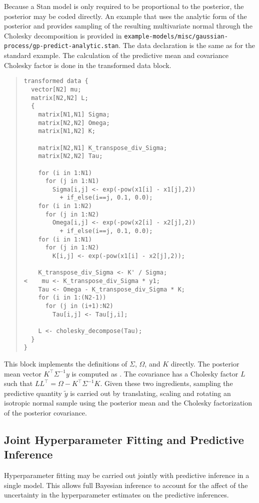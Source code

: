 Because a Stan model is only required to be proportional to the
posterior, the posterior may be coded directly.  An example that uses
the analytic form of the posterior and provides sampling of the
resulting multivariate normal through the Cholesky decomposition is
provided in
\nolinkurl{example-models/misc/gaussian-process/gp-predict-analytic.stan}.  
The data declaration is the same as for the standard example.  The
calculation of the predictive mean  and covariance Cholesky
factor  is done in the transformed data block.
%
\begin{quote}
\begin{Verbatim}[fontsize=\small]
transformed data {
  vector[N2] mu;
  matrix[N2,N2] L;
  { 
    matrix[N1,N1] Sigma;
    matrix[N2,N2] Omega;
    matrix[N1,N2] K;
    
    matrix[N2,N1] K_transpose_div_Sigma;
    matrix[N2,N2] Tau;

    for (i in 1:N1) 
      for (j in 1:N1)
        Sigma[i,j] <- exp(-pow(x1[i] - x1[j],2)) 
          + if_else(i==j, 0.1, 0.0);
    for (i in 1:N2) 
      for (j in 1:N2)
        Omega[i,j] <- exp(-pow(x2[i] - x2[j],2)) 
          + if_else(i==j, 0.1, 0.0); 
    for (i in 1:N1)
      for (j in 1:N2)
        K[i,j] <- exp(-pow(x1[i] - x2[j],2));
    
    K_transpose_div_Sigma <- K' / Sigma;
<    mu <- K_transpose_div_Sigma * y1; 
    Tau <- Omega - K_transpose_div_Sigma * K;
    for (i in 1:(N2-1))
      for (j in (i+1):N2)
        Tau[i,j] <- Tau[j,i];

    L <- cholesky_decompose(Tau);
  }
}
\end{Verbatim}
\end{quote}
%
This block implements the definitions of $\Sigma$, $\Omega$, and $K$
directly.  The posterior mean vector $K^{\top}\Sigma^{-1}y$ is
computed as .  The covariance has a Cholesky factor $L$ such
that $LL^{\top} = \Omega - K^{\top}\Sigma^{-1}K$.  Given these two
ingredients, sampling the predictive quantity $\tilde{y}$ is carried
out by translating, scaling and rotating an isotropic normal sample 
using the posterior mean and the Cholesky factorization of the
posterior covariance.


\subsection{Joint Hyperparameter Fitting and Predictive Inference}

Hyperparameter fitting may be carried out jointly with predictive
inference in a single model.  This allows full Bayesian inference to
account for the affect of the uncertainty in the hyperparameter
estimates on the predictive inferences.  

